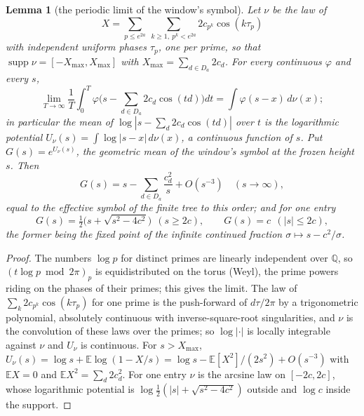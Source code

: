\documentclass[11pt]{article}
\newtheorem{lemma}[theorem]{Lemma}
\theoremstyle{definition}
\theoremstyle{remark}
\begin{document}
\begin{lemma}[the periodic limit of the window's symbol]\label{lem:periodic}
Let $\nu$ be the law of
\[
X=\sum_{p\le e^{2a}}\ \sum_{k\ge1,\ p^k<e^{2a}}2c_{p^k}\cos(k\tau_p)
\]
with independent uniform phases $\tau_p$, one per prime, so that $\operatorname{supp}\nu=[-X_{\max},X_{\max}]$ with $X_{\max}=\sum_{d\in D_a}2c_d$. For every continuous $\varphi$ and every $s$,
\[
\lim_{T\to\infty}\frac1T\int_0^T\varphi\Big(s-\sum_{d\in D_a}2c_d\cos(td)\Big)dt=\int\varphi(s-x)\,d\nu(x);
\]
in particular the mean of $\log|s-\sum_d2c_d\cos(td)|$ over $t$ is the logarithmic potential $U_\nu(s)=\int\log|s-x|\,d\nu(x)$, a continuous function of $s$. Put $G(s)=e^{U_\nu(s)}$, the geometric mean of the window's symbol at the frozen height $s$. Then
\[
G(s)=s-\sum_{d\in D_a}\frac{c_d^2}{s}+O(s^{-3})\quad(s\to\infty),
\]
equal to the effective symbol of the finite tree to this order; and for one entry
\[
G(s)=\tfrac12\big(s+\sqrt{s^2-4c^2}\big)\ \ (s\ge2c),\qquad G(s)=c\ \ (|s|\le2c),
\]
the former being the fixed point of the infinite continued fraction $\sigma\mapsto s-c^2/\sigma$.
\end{lemma}
\begin{proof}
The numbers $\log p$ for distinct primes are linearly independent over $\mathbb Q$, so $(t\log p\bmod2\pi)_p$ is equidistributed on the torus (Weyl), the prime powers riding on the phases of their primes; this gives the limit. The law of $\sum_k2c_{p^k}\cos(k\tau_p)$ for one prime is the push-forward of $d\tau/2\pi$ by a trigonometric polynomial, absolutely continuous with inverse-square-root singularities, and $\nu$ is the convolution of these laws over the primes; so $\log|\cdot|$ is locally integrable against $\nu$ and $U_\nu$ is continuous. For $s>X_{\max}$, $U_\nu(s)=\log s+\mathbb E\log(1-X/s)=\log s-\mathbb E[X^2]/(2s^2)+O(s^{-3})$ with $\mathbb E X=0$ and $\mathbb E X^2=\sum_d2c_d^2$. For one entry $\nu$ is the arcsine law on $[-2c,2c]$, whose logarithmic potential is $\log\tfrac12(|s|+\sqrt{s^2-4c^2})$ outside and $\log c$ inside the support.
\end{proof}
\end{document}
